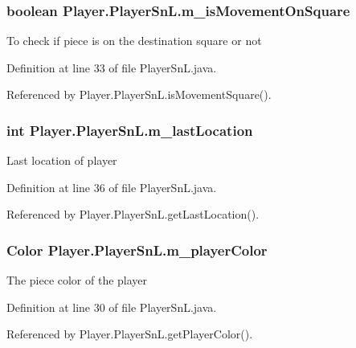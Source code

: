 \subsubsection[{m\+\_\+is\+Movement\+On\+Square}]{\setlength{\rightskip}{0pt plus 5cm}boolean Player.\+Player\+Sn\+L.\+m\+\_\+is\+Movement\+On\+Square}\label{class_player_1_1_player_sn_l_a41a8f9cd3f8340cccedd9393a8698477}
To check if piece is on the destination square or not 

Definition at line 33 of file Player\+Sn\+L.\+java.



Referenced by Player.\+Player\+Sn\+L.\+is\+Movement\+Square().

\hypertarget{class_player_1_1_player_sn_l_a67ec420adf012813b5b6bf74237e0180}{}
\subsubsection[{m\+\_\+last\+Location}]{\setlength{\rightskip}{0pt plus 5cm}int Player.\+Player\+Sn\+L.\+m\+\_\+last\+Location}\label{class_player_1_1_player_sn_l_a67ec420adf012813b5b6bf74237e0180}
Last location of player 

Definition at line 36 of file Player\+Sn\+L.\+java.



Referenced by Player.\+Player\+Sn\+L.\+get\+Last\+Location().

\hypertarget{class_player_1_1_player_sn_l_a9fb98bcd7461b8b5a3193ecc8d00fcaa}{}
\subsubsection[{m\+\_\+player\+Color}]{\setlength{\rightskip}{0pt plus 5cm}Color Player.\+Player\+Sn\+L.\+m\+\_\+player\+Color}\label{class_player_1_1_player_sn_l_a9fb98bcd7461b8b5a3193ecc8d00fcaa}
The piece color of the player 

Definition at line 30 of file Player\+Sn\+L.\+java.



Referenced by Player.\+Player\+Sn\+L.\+get\+Player\+Color().

